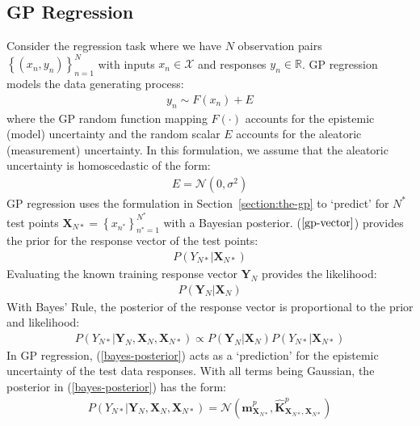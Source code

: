 \documentclass{article}
\numberwithin{equation}{section}
\begin{document}
\subsection{GP Regression}
Consider the regression task where we have $N$ observation pairs $\left\{(x_n, y_n)\right\}_{n=1}^{N}$ with inputs $x_n \in \mathcal{X}$ and responses $y_n \in \mathbb{R}$. GP regression models the data generating process:
\begin{align}
    y_n \sim F(x_n) + E
    \label{regression-data-uncertainties}
\end{align}
where the GP random function mapping $F(\cdot)$ accounts for the epistemic (model) uncertainty and the random scalar $E$ accounts for the aleatoric (measurement) uncertainty. In this formulation, we assume that the aleatoric uncertainty is homoscedastic of the form:
\begin{align}
    E = \mathcal{N} \left(0, \sigma^2\right)
    \label{aleotric-uncertainty}
\end{align}
GP regression uses the formulation in Section~\ref{section:the-gp} to `predict' for $N^*$ test points $\mathbf{X}_{N*} = \left\{ x_{n^*}\right\}_{n^*=1}^{N^*}$ with a Bayesian posterior. ($\ref{gp-vector}$) provides the prior for the response vector of the test points:
\begin{align}
    \label{gp-prior}
    P\left(Y_{N*}\vert \mathbf{X}_{N*}\right)
\end{align}
Evaluating the known training response vector $\mathbf{Y}_{N}$ provides the likelihood:
\begin{align}
     \label{gp-likelihood}
    P\left(\mathbf{Y}_{N} \vert \mathbf{X}_{N} \right)
\end{align}
With Bayes' Rule, the posterior of the response vector is proportional to the prior and likelihood:
\begin{align}
     P\left(Y_{N*} | \mathbf{Y}_{N},  \mathbf{X}_{N},  \mathbf{X}_{N*}\right) \propto P\left(\mathbf{Y}_{N} \vert \mathbf{X}_{N} \right) P\left(Y_{N*}\vert \mathbf{X}_{N*}\right)
    \label{bayes-posterior}
\end{align}
In GP regression, (\ref{bayes-posterior}) acts as a `prediction' for the epistemic uncertainty of the test data responses. With all terms being Gaussian, the posterior in (\ref{bayes-posterior}) has the form:
\begin{align}
    P\left(Y_{N*} | \mathbf{Y}_{N},  \mathbf{X}_{N},  \mathbf{X}_{N*}\right)  =  \mathcal{N}\left(\hat{\mathbf{m}}^p_{\mathbf{X}_{N*}}, \hat{\mathbf{K}}^p_{\mathbf{X}_{N*}, \mathbf{X}_{N*}}\right)
    \label{gp-epistemic-posterior}
\end{align}
\end{document}
